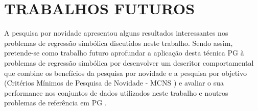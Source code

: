 \section{TRABALHOS FUTUROS}
\label{sec:9futuros}

A pesquisa por novidade apresentou alguns resultados interessantes nos problemas de regressão simbólica discutidos neste
trabalho. Sendo assim, pretende-se como trabalho futuro aprofundar a aplicação desta técnica
\ac{PG} à problemas de regressão simbólica por desenvolver um descritor comportamental que combine os 
benefícios da pesquisa por novidade e a pesquisa por objetivo (Critérios Mínimos de Pesquisa de Novidade - \ac{MCNS} 
\citep{lehman2010revising,gomes2012progressive}) e avaliar o sua performance nos conjuntos de dados utilizados
neste trabalho e noutros problemas de referência em \ac{PG} \citep{McDermott:2012:GECCO}.
